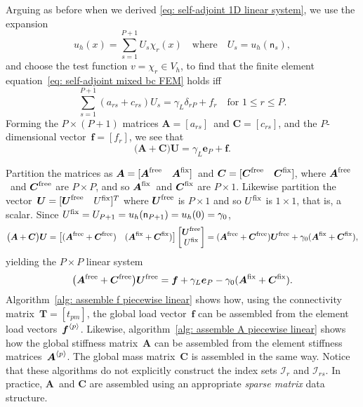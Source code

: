 Arguing as before when we derived \eqref{eq: self-adjoint 1D linear system},
we use the expansion
\[
u_h(x)=\sum_{s=1}^{P+1}U_s\chi_r(x)\quad\text{where}\quad U_s=u_h(\mathsf{n}_s),
\]
and choose the test function $v=\chi_r\in V_h$, to find that the finite 
element equation~\eqref{eq: self-adjoint mixed bc FEM} holds iff
\[
\sum_{s=1}^{P+1}(a_{rs}+c_{rs})U_s=\gamma_L\delta_{rP}+f_r
\quad\text{for $1\le r\le P$.}
\]
Forming the $P\times(P+1)$ matrices $\boldsymbol{A}=[a_{rs}]$~and
$\boldsymbol{C}=[c_{rs}]$, and the $P$-dimensional
vector~$\boldsymbol{f}=[f_r]$, we see that
\begin{equation}\label{eq: A C f example}
\bigl(\boldsymbol{A}+\boldsymbol{C}\bigr)\boldsymbol{U}
    =\gamma_L\boldsymbol{e}_P+\boldsymbol{f}.
\end{equation}

Partition the matrices as
$\boldsymbol{A}=[\boldsymbol{A}^{\mathrm{free}}\quad\boldsymbol{A}^{\mathrm{fix}}]$~and
$\boldsymbol{C}=[\boldsymbol{C}^{\mathrm{free}}\quad\boldsymbol{C}^{\mathrm{fix}}]$, where
$\boldsymbol{A}^{\mathrm{free}}$~and $\boldsymbol{C}^{\mathrm{free}}$ are $P\times P$, and so
$\boldsymbol{A}^{\mathrm{fix}}$~and $\boldsymbol{C}^{\mathrm{fix}}$ are $P\times1$.  Likewise
partition the vector~$\boldsymbol{U}=[\boldsymbol{U}^{\mathrm{free}}\quad U^{\mathrm{fix}}]^T$ where
$\boldsymbol{U}^{\mathrm{free}}$ is $P\times1$ and so $U^{\mathrm{fix}}$ is $1\times1$, that is, a
scalar.  Since $U^{\mathrm{fix}}=U_{P+1}=u_h(\mathsf{n}_{P+1})=u_h(0)=\gamma_0$,
\[
\bigl(\boldsymbol{A}+\boldsymbol{C}\bigr)\boldsymbol{U}
    =\bigl[(\boldsymbol{A}^{\mathrm{free}}+\boldsymbol{C}^{\mathrm{free}})\quad
    (\boldsymbol{A}^{\mathrm{fix}}+\boldsymbol{C}^{\mathrm{fix}})\bigr]
    \begin{bmatrix}\boldsymbol{U}^{\mathrm{free}}\\ U^{\mathrm{fix}}\end{bmatrix}
    =(\boldsymbol{A}^{\mathrm{free}}+\boldsymbol{C}^{\mathrm{free}})\boldsymbol{U}^{\mathrm{free}}
    +\gamma_0(\boldsymbol{A}^{\mathrm{fix}}+\boldsymbol{C}^{\mathrm{fix}}),
\]
yielding the $P\times P$ linear system
\begin{equation}\label{eq: FEM 1d mixed linear system}
\bigl(\boldsymbol{A}^{\mathrm{free}}+\boldsymbol{C}^{\mathrm{free}}\bigr)\boldsymbol{U}^{\mathrm{free}}
=\boldsymbol{f}+\gamma_L\boldsymbol{e}_P
    -\gamma_0(\boldsymbol{A}^{\mathrm{fix}}+\boldsymbol{C}^{\mathrm{fix}}).
\end{equation}
Algorithm~\ref{alg: assemble f piecewise linear} shows how, using the 
connectivity matrix~$\boldsymbol{T}=[t_{pm}]$, the global load 
vector~$\boldsymbol{f}$ can be assembled from the element load 
vectors~$\boldsymbol{f}^{\langle p\rangle}$.  Likewise, 
algorithm~\ref{alg: assemble A piecewise linear} shows how the global 
stiffness matrix~$\boldsymbol{A}$ can be assembled from the element stiffness 
matrices~$\boldsymbol{A}^{\langle p\rangle}$.  The global mass matrix~$\boldsymbol{C}$ is 
assembled in the same way. Notice that these algorithms do not explicitly
construct the index sets $\mathcal{I}_r$ and $\mathcal{I}_{rs}$. In practice,
$\boldsymbol{A}$~and $\boldsymbol{C}$ are assembled using an appropriate
\emph{sparse matrix} data structure.

